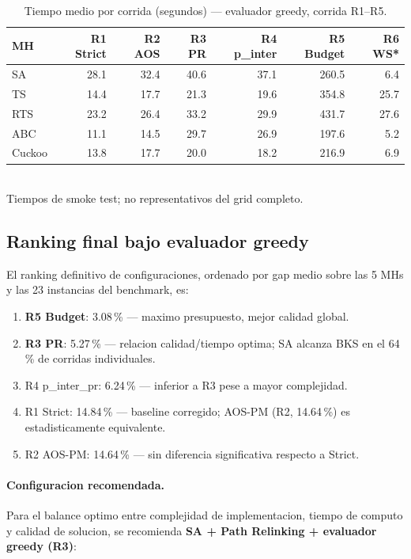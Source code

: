 \begin{table}[h]
\centering
\caption{Tiempo medio por corrida (segundos) — evaluador greedy, corrida R1--R5.}
\label{tab:tiempo-medio}
\small
\begin{tabular}{lrrrrrr}
\toprule
MH & R1 Strict & R2 AOS & R3 PR & R4 p\_inter & R5 Budget & R6 WS* \\
\midrule
SA      &  28.1 &  32.4 &  40.6 &  37.1 & 260.5 &   6.4 \\
TS      &  14.4 &  17.7 &  21.3 &  19.6 & 354.8 &  25.7 \\
RTS     &  23.2 &  26.4 &  33.2 &  29.9 & 431.7 &  27.6 \\
ABC     &  11.1 &  14.5 &  29.7 &  26.9 & 197.6 &   5.2 \\
Cuckoo  &  13.8 &  17.7 &  20.0 &  18.2 & 216.9 &   6.9 \\
\bottomrule
\end{tabular}
\\[4pt]
\footnotesize *Tiempos de smoke test; no representativos del grid completo.
\end{table}

\subsection{Ranking final bajo evaluador greedy}

El ranking definitivo de configuraciones, ordenado por gap medio
sobre las 5 MHs y las 23 instancias del benchmark, es:

\begin{enumerate}
\item \textbf{R5 Budget}: 3.08\,\% — maximo presupuesto, mejor calidad global.
\item \textbf{R3 PR}: 5.27\,\% — relacion calidad/tiempo optima;
      SA alcanza BKS en el 64\,\% de corridas individuales.
\item R4 p\_inter\_pr: 6.24\,\% — inferior a R3 pese a mayor complejidad.
\item R1 Strict: 14.84\,\% — baseline corregido; AOS-PM (R2, 14.64\,\%)
      es estadisticamente equivalente.
\item R2 AOS-PM: 14.64\,\% — sin diferencia significativa respecto a Strict.
\end{enumerate}

\paragraph{Configuracion recomendada.}
Para el balance optimo entre complejidad de implementacion, tiempo de
computo y calidad de solucion, se recomienda \textbf{SA + Path Relinking
+ evaluador greedy (R3)}:

